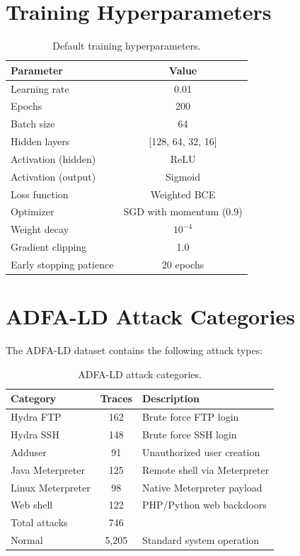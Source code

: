 \section{Training Hyperparameters}
\label{app:hyperparams}

\begin{table}[h]
\centering
\caption{Default training hyperparameters.}
\label{tab:hyperparams-app}
\begin{tabular}{lc}
\toprule
\textbf{Parameter} & \textbf{Value} \\
\midrule
Learning rate & 0.01 \\
Epochs & 200 \\
Batch size & 64 \\
Hidden layers & [128, 64, 32, 16] \\
Activation (hidden) & ReLU \\
Activation (output) & Sigmoid \\
Loss function & Weighted BCE \\
Optimizer & SGD with momentum (0.9) \\
Weight decay & $10^{-4}$ \\
Gradient clipping & 1.0 \\
Early stopping patience & 20 epochs \\
\bottomrule
\end{tabular}
\end{table}

\section{ADFA-LD Attack Categories}
\label{app:adfa}

The ADFA-LD dataset contains the following attack types:

\begin{table}[h]
\centering
\caption{ADFA-LD attack categories.}
\label{tab:adfa-attacks}
\begin{tabular}{lcp{4cm}}
\toprule
\textbf{Category} & \textbf{Traces} & \textbf{Description} \\
\midrule
Hydra FTP & 162 & Brute force FTP login \\
Hydra SSH & 148 & Brute force SSH login \\
Adduser & 91 & Unauthorized user creation \\
Java Meterpreter & 125 & Remote shell via Meterpreter \\
Linux Meterpreter & 98 & Native Meterpreter payload \\
Web shell & 122 & PHP/Python web backdoors \\
\midrule
Total attacks & 746 & \\
Normal & 5,205 & Standard system operation \\
\bottomrule
\end{tabular}
\end{table}

